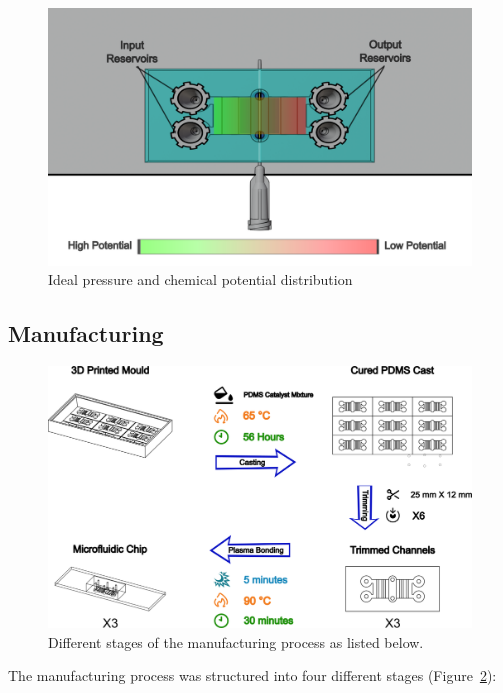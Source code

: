 \documentclass[letterpaper,12pt]{article}
\begin{document}
\newpage


\begin{figure}
    \centering
    \includegraphics[width=0.4\linewidth]{figures/potential gradient.png}
    \caption{Ideal pressure and chemical potential distribution}
    \label{fig:pressure gradient}
\end{figure}


\subsection{Manufacturing}
\begin{figure}[h!]
    \centering
    \includegraphics[width=1\textwidth]{figures/manufacture_procedure.png}
    \caption{Different stages of the manufacturing process as listed below.}\label{fig:manufac}
\end{figure}

\newpage
The manufacturing process was structured into four different stages (Figure~\ref{fig:manufac}):
\end{document}
